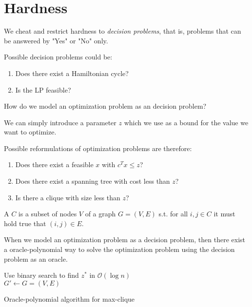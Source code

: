 

\section{Hardness}
We cheat and restrict hardness to \emph{decision problems}, that is, problems
that can be answered by "Yes" or "No" only.
\begin{example} Possible decision problems could be:
    \begin{enumerate}
        \item Does there exist a Hamiltonian cycle?
        \item Is the LP feasible?
    \end{enumerate}
\end{example}
\begin{question}
    How do we model an optimization problem as an decision problem?
\end{question}
\begin{answer}
    We can simply introduce a parameter $z$ which we use as a bound for the value we want to optimize.
\end{answer}
\begin{example} Possible reformulations of optimization problems are therefore:
    \begin{enumerate}
        \item Does there exist a feasible $x$ with $c^Tx \leq z$?
        \item Does there exist a spanning tree with cost less than $z$?
        \item Is there a clique with size less than $z$?
    \end{enumerate}
\end{example}
\begin{definition}
    A  $C$ is a subset of nodes $V$ of a graph $G=(V,E)$ s.t.
    for all $i,j \in C$ it must hold true that $(i,j)\in E$.
\end{definition}
\begin{theorem}
    When we model an optimization problem as a decision problem, then there exist
    a oracle-polynomial way to solve the optimization problem using the decision problem
    as an oracle.
\end{theorem}
\begin{algorithm}[H]
    \SetAlgoLined
    Use binary search to find $z^*$ in $\mathcal{O}(\log n)$\\
    $G' \leftarrow G = (V,E)$\\
    \caption{Oracle-polynomial algorithm for max-clique}
\end{algorithm} \noindent

